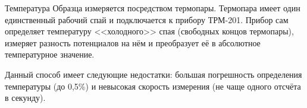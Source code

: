 \label{sec_t_measures}

Температура Образца измеряется посредством термопары. Термопара имеет один единственный рабочий спай и подключается к прибору ТРМ-201. Прибор сам определяет температуру <<холодного>> спая (свободных концов термопары), измеряет разность потенциалов на нём и преобразует её в абсолютное температурное значение.

Данный способ имеет следующие недостатки: большая погрешность определения температуры (до 0,5\%) и невысокая скорость измерения (не чаще одного отсчёта в секунду).